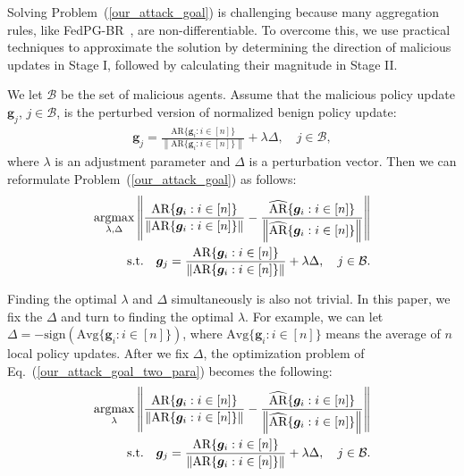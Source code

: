 \label{subsec:optimization}



Solving Problem~(\ref{our_attack_goal}) is challenging because many aggregation rules, like FedPG-BR~\cite{fan2021fault}, are non-differentiable. To overcome this, we use practical techniques to approximate the solution by determining the direction of malicious updates in Stage I, followed by calculating their magnitude in Stage II.



We let $\mathcal{B}$ be the set of malicious agents.
Assume that the malicious policy update $\bm{g}_j$, $j \in \mathcal{B}$, is the perturbed version of normalized benign policy update:
\begin{align}
\bm{g}_j = \frac{{\text{AR}} \{ \bm{g}_i: i \in [n]\} }{\left\|{\text{AR}} \{ \bm{g}_i: i \in [n]\} \right\|}+ \lambda \Delta, \quad j \in \mathcal{B},
\end{align}
where $\lambda$ is an adjustment parameter and $\Delta$ is a perturbation vector.
Then we can reformulate Problem~(\ref{our_attack_goal}) as follows:
\begin{equation}
\begin{split}
\label{our_attack_goal_two_para}
\operatorname*{argmax}_{\lambda, \Delta}  \left\| \frac{{\text{AR}} \{ \bm{g}_i: i \in [n]\} }{\left\|{\text{AR}} \{ \bm{g}_i: i \in [n]\} \right\|} - \frac{\widehat{\text{AR}} \{ \bm{g}_i: i \in [n]\} }{\left\| \widehat{\text{AR}} \{ \bm{g}_i: i \in [n]\}  \right\|} \right\| \\
\text{s.t.}  \quad
\bm{g}_j = \frac{{\text{AR}} \{ \bm{g}_i: i \in [n]\} }{\left\|{\text{AR}} \{ \bm{g}_i: i \in [n]\} \right\|}+ \lambda \Delta, \quad j \in \mathcal{B}.
\end{split}
\end{equation}



Finding the optimal $\lambda$ and $\Delta$ simultaneously is also not trivial.
In this paper, we fix the $\Delta$ and turn to finding the optimal $\lambda$. 
For example, we can let $\Delta = -\text{sign}(\text{Avg} \{ \bm{g}_i: i \in [n]\})$, where $\text{Avg} \{ \bm{g}_i: i \in [n]\}$ means the average of $n$ local policy updates.
%
After we fix  $\Delta$, the optimization problem of Eq.~(\ref{our_attack_goal_two_para}) becomes the following:
\begin{equation}
\begin{split}
\label{our_attack_goal_one_para}
\operatorname*{argmax}_{\lambda}  \left\| \frac{{\text{AR}} \{ \bm{g}_i: i \in [n]\} }{\left\|{\text{AR}} \{ \bm{g}_i: i \in [n]\} \right\|} - \frac{\widehat{\text{AR}} \{ \bm{g}_i: i \in [n]\} }{\left\| \widehat{\text{AR}} \{ \bm{g}_i: i \in [n]\}  \right\|} \right\| \\
\text{s.t.} \quad
\bm{g}_j = \frac{{\text{AR}} \{ \bm{g}_i: i \in [n]\} }{\left\|{\text{AR}} \{ \bm{g}_i: i \in [n]\} \right\|}+ \lambda \Delta, \quad j \in \mathcal{B}.
\end{split}
\end{equation}



